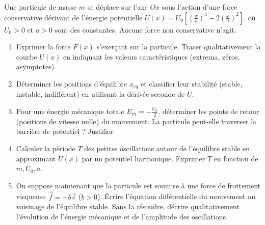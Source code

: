 \documentclass[11pt]{article}
\begin{document}
\begin{exercice}
Une particule de masse $m$ se déplace sur l'axe $Ox$ sous l'action d'une force conservative dérivant de l'énergie potentielle $U(x) = U_0 \left[ \left(\frac{x}{a}\right)^4 - 2\left(\frac{x}{a}\right)^2 \right]$, où $U_0 > 0$ et $a > 0$ sont des constantes. Aucune force non conservative n'agit.
\begin{enumerate}
    \item Exprimer la force $F(x)$ s'exerçant sur la particule. Tracer qualitativement la courbe $U(x)$ en indiquant les valeurs caractéristiques (extrema, zéros, asymptotes).
    \item Déterminer les positions d'équilibre $x_{eq}$ et classifier leur stabilité (stable, instable, indifférent) en utilisant la dérivée seconde de $U$.
    \item Pour une énergie mécanique totale $E_m = -\frac{U_0}{2}$, déterminer les points de retour (positions de vitesse nulle) du mouvement. La particule peut-elle traverser la barrière de potentiel ? Justifier.
    \item Calculer la période $T$ des petites oscillations autour de l'équilibre stable en approximant $U(x)$ par un potentiel harmonique. Exprimer $T$ en fonction de $m, U_0, a$.
    \item On suppose maintenant que la particule est soumise à une force de frottement visqueuse $\vec{f} = -b\vec{v}$ ($b>0$). Écrire l'équation différentielle du mouvement au voisinage de l'équilibre stable. Sans la résoudre, décrire qualitativement l'évolution de l'énergie mécanique et de l'amplitude des oscillations.
\end{enumerate}
\end{exercice}
\end{document}
